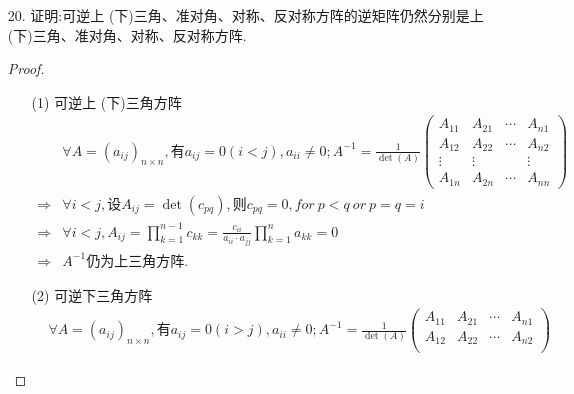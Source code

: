 \documentclass{article}
\begin{document}
\begin{enumerate}
\begin{proof}
\begin{align*}
                &tr(AB-BA)=te(AB)-tr(BA)=0,\\
                &tr(I_n)=n \neq 0 \quad \Rightarrow AB-BA\neq I_n,\forall A,B \in \mathbb{C}^{n\times n}.
            \end{align*}
            即证不存在$n$阶复方阵$A,B$满足$AB-BA=I$.
        \end{proof}
        \item [20.]证明:可逆上 (下)三角、准对角、对称、反对称方阵的逆矩阵仍然分别是上 (下)三角、准对角、对称、反对称方阵.
        \begin{proof}
            \begin{enumerate}
                \item [(1)]可逆上 (下)三角方阵
                \begin{align*}
                    &\forall A={(a_{ij})}_{n\times n},\mbox{有}
                    a_{ij}=0(i<j),a_{ii}\neq 0;
                    A^{-1}=\frac{1}{\det(A)}
                    \begin{pmatrix}
                        A_{11} & A_{21} & \cdots & A_{n1}\\
                        A_{12} & A_{22} & \cdots & A_{n2}\\
                        \vdots & \vdots &        & \vdots\\
                        A_{1n} & A_{2n} & \cdots & A_{nn}
                    \end{pmatrix}\\
                    \Rightarrow
                    &\forall i<j,\mbox{设}A_{ij}=\det{(c_{pq})},
                    \mbox{则}c_{pq}=0,for\ p<q\ or\ p=q=i\\
                    \Rightarrow
                    &\forall i<j,A_{ij}=\prod\limits_{k=1}^{n-1} c_{kk}=\frac{c_{ii}}{a_{ii}\cdot a_{jj}} \prod\limits_{k=1}^{n}a_{kk}=0\\
                    \Rightarrow
                    &A^{-1}\mbox{仍为上三角方阵.}
                \end{align*}
                \item [(2)]可逆下三角方阵
                \begin{align*}
                    &\forall A={(a_{ij})}_{n\times n},\mbox{有}
                    a_{ij}=0(i>j),a_{ii}\neq 0;
                    A^{-1}=\frac{1}{\det(A)}
                    \begin{pmatrix}
                        A_{11} & A_{21} & \cdots & A_{n1}\\
                        A_{12} & A_{22} & \cdots & A_{n2}\\

\end{pmatrix}
\end{align*}
\end{enumerate}
\end{proof}
\end{enumerate}
\end{document}
